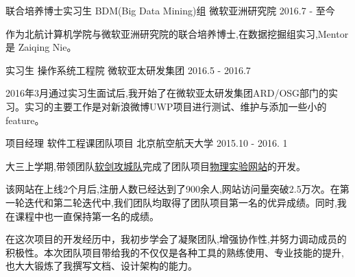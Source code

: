 


\begin{cventries}

\cventry
{联合培养博士实习生} %
{BDM(Big Data Mining)组} %
{微软亚洲研究院} %
{2016.7 - 至今} %
{ %
	\begin{cvitems}
		\item {作为北航计算机学院与微软亚洲研究院的联合培养博士,在数据挖掘组实习,Mentor 是 Zaiqing Nie。}
	\end{cvitems}
}

\cventry
{实习生} %
{操作系统工程院} %
{微软亚太研发集团} %
{2016.5 - 2016.7} %
{ %
	\begin{cvitems}
		\item {2016年3月通过实习生面试后,我开始了在微软亚太研发集团ARD/OSG部门的实习。实习的主要工作是对新浪微博UWP项目进行测试、维护与添加一些小的feature。}
	\end{cvitems}
}

\cventry
{项目经理} %
{软件工程课团队项目} %
{北京航空航天大学} %
{2015.10 - 2016. 1} %
{ %
\begin{cvitems}
\item {大三上学期,带领团队\href{http://www.cnblogs.com/buaase}{软剑攻城队}完成了团队项目\href{http://buaaphylab.com/}{物理实验网站}的开发。}
\item {该网站在上线2个月后,注册人数已经达到了900余人,网站访问量突破2.5万次。在第一轮迭代和第二轮迭代中,我们团队均取得了团队项目第一名的优异成绩。同时,我在课程中也一直保持第一名的成绩。}
\item {在这次项目的开发经历中，我初步学会了凝聚团队,增强协作性,并努力调动成员的积极性。本次团队项目带给我的不仅仅是各种工具的熟练使用、专业技能的提升,也大大锻炼了我撰写文档、设计架构的能力。}
\end{cvitems}
}


\end{cventries}
